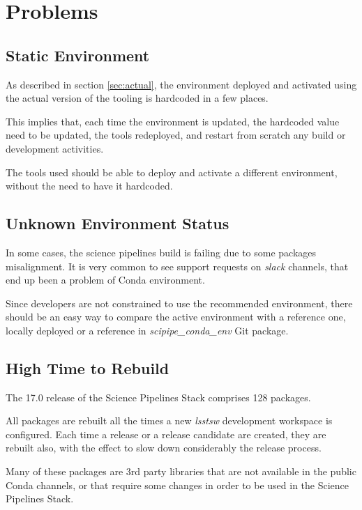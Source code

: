 \newpage
\section{Problems} \label{sec:problems}


\subsection{Static Environment} \label{sec:static}

As described in section \ref{sec:actual}, the environment deployed and activated using the actual version of the tooling is hardcoded in a few places.

This implies that, each time the environment is updated, the hardcoded value need to be updated, the tools redeployed, and restart from scratch any build or development activities.

The tools used should be able to deploy and activate a different environment, without the need to have it hardcoded.


\subsection{Unknown Environment Status} \label{sec:unknown}

In some cases, the science pipelines build is failing due to some packages misalignment. 
It is very common to see support requests on \textit{slack} channels, that end up been a problem of Conda environment.

Since developers are not constrained to use the recommended environment, there should be an easy way to compare the active environment  with a reference one, locally deployed or a reference in \textit{scipipe\_conda\_env} Git package.


\subsection{High Time to Rebuild} \label{sec:high}

The 17.0 release of the Science Pipelines Stack comprises 128 packages.

All packages are rebuilt all the times a new \textit{lsstsw} development workspace is configured. 
Each time a release or a release candidate are created, they are rebuilt also, with the effect to slow down considerably the release process.

Many of these packages are 3rd party libraries that are not available in the public Conda channels, or that require some changes in order to be used in the Science Pipelines Stack.

